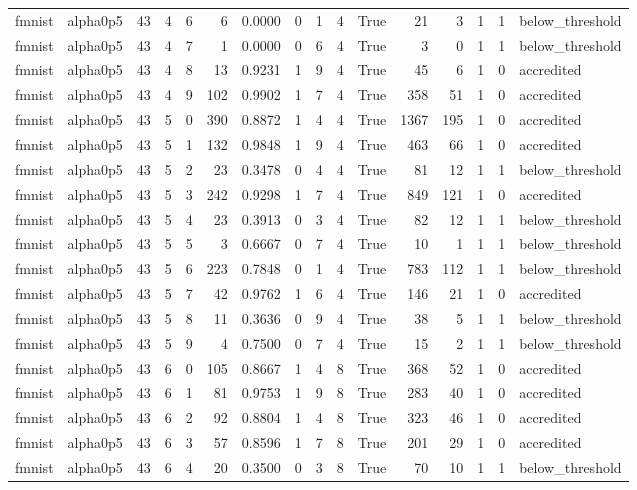 \begin{tabular}{llrrrrrrrrrrrrrl}
fmnist & alpha0p5 & 43 & 4 & 6 & 6 & 0.0000 & 0 & 1 & 4 & True & 21 & 3 & 1 & 1 & below\_threshold \\
fmnist & alpha0p5 & 43 & 4 & 7 & 1 & 0.0000 & 0 & 6 & 4 & True & 3 & 0 & 1 & 1 & below\_threshold \\
fmnist & alpha0p5 & 43 & 4 & 8 & 13 & 0.9231 & 1 & 9 & 4 & True & 45 & 6 & 1 & 0 & accredited \\
fmnist & alpha0p5 & 43 & 4 & 9 & 102 & 0.9902 & 1 & 7 & 4 & True & 358 & 51 & 1 & 0 & accredited \\
fmnist & alpha0p5 & 43 & 5 & 0 & 390 & 0.8872 & 1 & 4 & 4 & True & 1367 & 195 & 1 & 0 & accredited \\
fmnist & alpha0p5 & 43 & 5 & 1 & 132 & 0.9848 & 1 & 9 & 4 & True & 463 & 66 & 1 & 0 & accredited \\
fmnist & alpha0p5 & 43 & 5 & 2 & 23 & 0.3478 & 0 & 4 & 4 & True & 81 & 12 & 1 & 1 & below\_threshold \\
fmnist & alpha0p5 & 43 & 5 & 3 & 242 & 0.9298 & 1 & 7 & 4 & True & 849 & 121 & 1 & 0 & accredited \\
fmnist & alpha0p5 & 43 & 5 & 4 & 23 & 0.3913 & 0 & 3 & 4 & True & 82 & 12 & 1 & 1 & below\_threshold \\
fmnist & alpha0p5 & 43 & 5 & 5 & 3 & 0.6667 & 0 & 7 & 4 & True & 10 & 1 & 1 & 1 & below\_threshold \\
fmnist & alpha0p5 & 43 & 5 & 6 & 223 & 0.7848 & 0 & 1 & 4 & True & 783 & 112 & 1 & 1 & below\_threshold \\
fmnist & alpha0p5 & 43 & 5 & 7 & 42 & 0.9762 & 1 & 6 & 4 & True & 146 & 21 & 1 & 0 & accredited \\
fmnist & alpha0p5 & 43 & 5 & 8 & 11 & 0.3636 & 0 & 9 & 4 & True & 38 & 5 & 1 & 1 & below\_threshold \\
fmnist & alpha0p5 & 43 & 5 & 9 & 4 & 0.7500 & 0 & 7 & 4 & True & 15 & 2 & 1 & 1 & below\_threshold \\
fmnist & alpha0p5 & 43 & 6 & 0 & 105 & 0.8667 & 1 & 4 & 8 & True & 368 & 52 & 1 & 0 & accredited \\
fmnist & alpha0p5 & 43 & 6 & 1 & 81 & 0.9753 & 1 & 9 & 8 & True & 283 & 40 & 1 & 0 & accredited \\
fmnist & alpha0p5 & 43 & 6 & 2 & 92 & 0.8804 & 1 & 4 & 8 & True & 323 & 46 & 1 & 0 & accredited \\
fmnist & alpha0p5 & 43 & 6 & 3 & 57 & 0.8596 & 1 & 7 & 8 & True & 201 & 29 & 1 & 0 & accredited \\
fmnist & alpha0p5 & 43 & 6 & 4 & 20 & 0.3500 & 0 & 3 & 8 & True & 70 & 10 & 1 & 1 & below\_threshold \\

\end{tabular}

